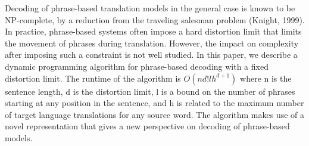 Decoding of phrase-based translation models in the general case is known to be NP-complete, by a reduction from the traveling salesman problem (Knight, 1999). In practice, phrase-based systems often impose a hard distortion limit that limits the movement of phrases during translation. However, the impact on complexity after imposing such a constraint is not well studied. In this paper, we describe a dynamic programming algorithm for phrase-based decoding with a fixed distortion limit. The runtime of the algorithm is $O(nd!lh^{d+1})$ where n is the sentence length, d is the distortion limit, l is a bound on the number of phrases starting at any position in the sentence, and h is related to the maximum number of target language translations for any source word. The algorithm makes use of a novel representation that gives a new perspective on decoding of phrase-based models.